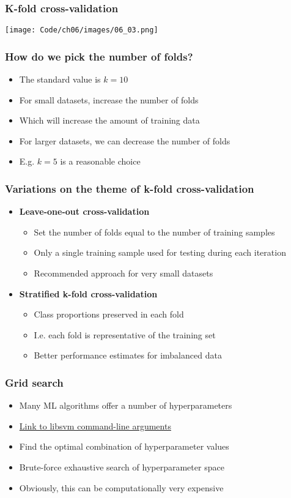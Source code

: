 \documentclass{beamer}
\begin{document}
\begin{frame}
  \frametitle{K-fold cross-validation}
  \texttt{[image: Code/ch06/images/06\_03.png]}
\end{frame}

\begin{frame}
  \frametitle{How do we pick the number of folds?}
  \begin{itemize}
  \item The standard value is $k=10$
  \item For small datasets, increase the number of folds
  \item Which will increase the amount of training data
  \item For larger datasets, we can decrease the number of folds
  \item E.g. $k=5$ is a reasonable choice
  \end{itemize}
\end{frame}

\begin{frame}
  \frametitle{Variations on the theme of k-fold cross-validation}
  \begin{itemize}
  \item \textbf{Leave-one-out cross-validation}
    \begin{itemize}
    \item Set the number of folds equal to the number of training samples
    \item Only a single training sample used for testing during each iteration
    \item Recommended approach for very small datasets
    \end{itemize}
  \item \textbf{Stratified k-fold cross-validation}
    \begin{itemize}
    \item Class proportions preserved in each fold
    \item I.e. each fold is representative of the training set
    \item Better performance estimates for imbalanced data
    \end{itemize}
  \end{itemize}
\end{frame}

\begin{frame}
  \frametitle{Grid search}
  \begin{itemize}
  \item Many ML algorithms offer a number of hyperparameters
  \item \href{https://www.csie.ntu.edu.tw/~cjlin/libsvm/}{Link to libsvm command-line arguments}
  \item Find the optimal combination of hyperparameter values
  \item Brute-force exhaustive search of hyperparameter space
  \item Obviously, this can be computationally very expensive
  \end{itemize}
\end{frame}
\end{document}
